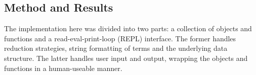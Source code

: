 \subsection{Method and Results}
    The implementation here was divided into two parts: a collection of objects and functions and a read-eval-print-loop (REPL) interface.
    The former handles reduction strategies, string formatting of terms and the underlying data structure.
    The latter handles user input and output, wrapping the objects and functions in a human-useable manner.
